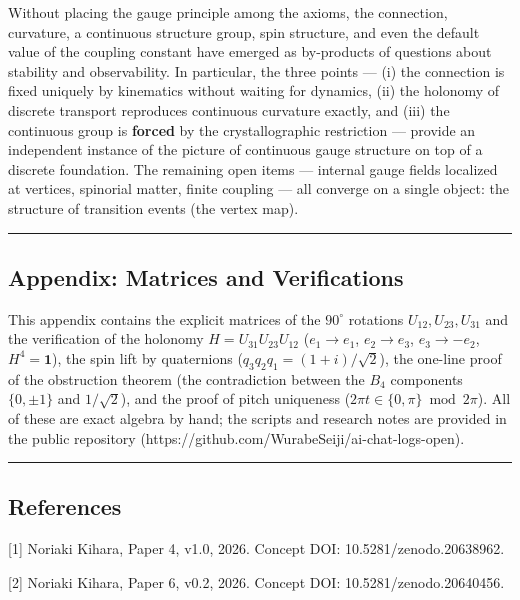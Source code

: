 \documentclass[
]{article}
\begin{document}
Without placing the gauge principle among the axioms, the connection,
curvature, a continuous structure group, spin structure, and even the
default value of the coupling constant have emerged as by-products of
questions about stability and observability. In particular, the three
points --- (i) the connection is fixed uniquely by kinematics without
waiting for dynamics, (ii) the holonomy of discrete transport reproduces
continuous curvature exactly, and (iii) the continuous group is
\textbf{forced} by the crystallographic restriction --- provide an
independent instance of the picture of continuous gauge structure on top
of a discrete foundation. The remaining open items --- internal gauge
fields localized at vertices, spinorial matter, finite coupling --- all
converge on a single object: the structure of transition events (the
vertex map).

\begin{center}\rule{0.5\linewidth}{0.5pt}\end{center}

\subsection{Appendix: Matrices and
Verifications}\label{appendix-matrices-and-verifications}

This appendix contains the explicit matrices of the \(90^\circ\)
rotations \(U_{12},U_{23},U_{31}\) and the verification of the holonomy
\(H=U_{31}U_{23}U_{12}\) (\(e_1\to e_1\), \(e_2\to e_3\),
\(e_3\to-e_2\), \(H^4=\mathbf{1}\)), the spin lift by quaternions
(\(q_3q_2q_1=(1+i)/\sqrt2\)), the one-line proof of the obstruction
theorem (the contradiction between the \(B_4\) components \(\{0,\pm1\}\)
and \(1/\sqrt2\)), and the proof of pitch uniqueness
(\(2\pi t\in\{0,\pi\}\bmod 2\pi\)). All of these are exact algebra by
hand; the scripts and research notes are provided in the public
repository (https://github.com/WurabeSeiji/ai-chat-logs-open).

\begin{center}\rule{0.5\linewidth}{0.5pt}\end{center}

\subsection{References}\label{references}

{[}1{]} Noriaki Kihara, Paper 4, v1.0, 2026. Concept DOI:
10.5281/zenodo.20638962.

{[}2{]} Noriaki Kihara, Paper 6, v0.2, 2026. Concept DOI: 10.5281/zenodo.20640456.
\end{document}
